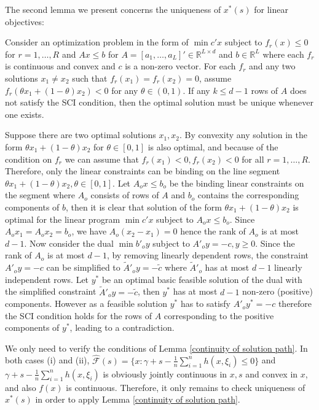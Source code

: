 \documentclass[mnsc,blindrev]{informs4} %
\newcommand{\R}{\mathbb{R}}
\begin{document}
The second lemma we present concerns the uniqueness of $x^*(s)$ for linear objectives:
\begin{lemma}\label{SCI uniqueness}
Consider an optimization problem in the form of $\min c'x$ subject to $f_r(x)\leq 0$ for $r=1,\ldots,R$ and $Ax\leq b$ for $A=[a_1,\ldots,a_L]'\in\R^{L\times d}$ and $b\in\R^L$ where each $f_r$ is continuous and convex and $c$ is a non-zero vector. For each $f_r$ and any two solutions $x_1\neq x_2$ such that $f_r(x_1)=f_r(x_2)=0$, assume $f_r(\theta x_1+(1-\theta)x_2)<0$ for any $\theta\in(0,1)$. If any $k\leq d-1$ rows of $A$ does not satisfy the SCI condition, then the optimal solution must be unique whenever one exists.
\end{lemma}
Suppose there are two optimal solutions $x_1,x_2$. By convexity any solution in the form $\theta x_1+(1-\theta)x_2$ for $\theta\in[0,1]$ is also optimal, and because of the condition on $f_r$ we can assume that $f_r(x_1)<0,f_r(x_2)<0$ for all $r=1,\ldots,R$. Therefore, only the linear constraints can be binding on the line segment $\theta x_1+(1-\theta)x_2,\theta\in[0,1]$. Let $A_ox\leq b_o$ be the binding linear constraints on the segment where $A_o$ consists of rows of $A$ and $b_o$ contains the corresponding components of $b$, then it is clear that solution of the form $\theta x_1+(1-\theta)x_2$ is optimal for the linear program $\min c'x$ subject to $A_ox\leq b_o$. Since $A_ox_1=A_ox_2=b_o$, we have $A_o(x_2-x_1)=0$ hence the rank of $A_o$ is at most $d-1$. Now consider the dual $\min b'_oy$ subject to $A'_oy=-c,y\geq 0$. Since the rank of $A_o$ is at most $d-1$, by removing linearly dependent rows, the constraint $A'_oy=-c$ can be simplified to $\tilde A'_oy=-\tilde c$ where $\tilde A'_o$ has at most $d-1$ linearly independent rows. Let $y^*$ be an optimal basic feasible solution of the dual with the simplified constraint $\tilde A'_oy=-\tilde c$, then $y^*$ has at most $d-1$ non-zero (positive) components. However as a feasible solution $y^*$ has to satisfy $A'_oy^*=-c$ therefore the SCI condition holds for the rows of $A$ corresponding to the positive components of $y^*$, leading to a contradiction.\hfill\Halmos

We only need to verify the conditions of Lemma \ref{continuity of solution path}. In both cases (i) and (ii), $\hat{\mathcal F}(s)=\{x:\gamma+s-\frac{1}{n}\sum_{i=1}^nh(x,\xi_i)\leq 0\}$ and $\gamma+s-\frac{1}{n}\sum_{i=1}^nh(x,\xi_i)$ is obviously jointly continuous in $x,s$ and convex in $x$, and also $f(x)$ is continuous. Therefore, it only remains to check uniqueness of $x^*(s)$ in order to apply Lemma \ref{continuity of solution path}.
\end{document}
